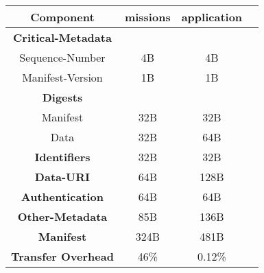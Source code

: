 \documentclass{standalone}
\begin{document}
\begin{tabular}{cccc}
    \hline
    \textbf{Component}          & missions & application  \\ \hline
    \textbf{Critical-Metadata}  &          &              \\
            Sequence-Number     & 4B       & 4B           \\
            Manifest-Version    & 1B       & 1B           \\
    \textbf{Digests}            &          &              \\
            Manifest            & 32B      & 32B          \\
            Data                & 32B      & 64B          \\
    \textbf{Identifiers}        & 32B      & 32B          \\
    \textbf{Data-URI}           & 64B      & 128B         \\
    \textbf{Authentication}     & 64B      & 64B          \\
    \textbf{Other-Metadata}     & 85B      & 136B         \\ \hline
    \textbf{Manifest}           & 324B     & 481B         \\ \hline
    \textbf{Transfer Overhead}  & 46\%     & 0.12\%       \\ \hline
\end{tabular}%
\end{document}
